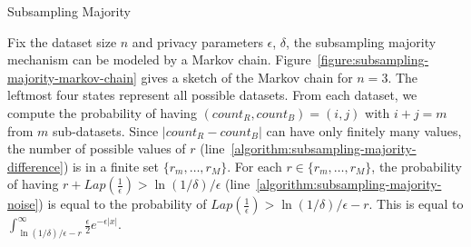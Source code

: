 \begin{algorithm}
  \begin{algorithmic}[1]
    \label{algorithm:subsampling-majority-subsample}
    \label{algorithm:subsampling-majority-count}
    \label{algorithm:subsampling-majority-difference}
    \label{algorithm:subsampling-majority-noise}
      \label{algorithm:subsampling-majority-output}
    \Else
      \State{\Return {$\bot$}}
      \label{algorithm:subsampling-majority-mute}
    \EndIf
  \EndFunction
  \end{algorithmic}
  \caption{Subsampling Majority}
  \label{algorithm:subsampling-majority}
\end{algorithm}

Fix the dataset size $n$ and privacy parameters $\epsilon$, $\delta$,
the subsampling majority mechanism can be modeled by a Markov chain.
Figure~\ref{figure:subsampling-majority-markov-chain} gives a sketch
of the Markov chain for $n = 3$. The leftmost four states represent
all possible datasets. From each dataset, we compute the probability
of having $(\mathit{count}_R, \mathit{count}_B) = (i, j)$ with $i + j
= m$ from $m$ sub-datasets. Since $| \mathit{count}_R -
\mathit{count}_B |$ can have only finitely many values, the number of
possible values of $r$ 
(line~\ref{algorithm:subsampling-majority-difference}) is in a finite
set $\{ r_m, \ldots, r_M \}$. For each $r \in \{ r_m, \ldots, r_M \}$,
the probability of having $r + \mathit{Lap}(\frac{1}{\epsilon}) > \ln
(1/\delta)/\epsilon$ (line~\ref{algorithm:subsampling-majority-noise})
is equal to the probability of $\mathit{Lap}(\frac{1}{\epsilon}) > \ln
(1/\delta)/\epsilon - r$. This is equal to $\int^{\infty}_{\ln
  (1/\delta)/\epsilon - r} \frac{\epsilon}{2}e^{-\epsilon|x|}$. 


